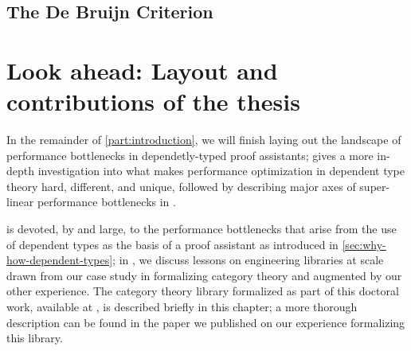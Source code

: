 \subsection{The De Bruijn Criterion}\label{sec:debruijn-criterion}

\section{Look ahead: Layout and contributions of the thesis}\label{sec:intro:layout}
In the remainder of \autoref{part:introduction}, we will finish laying out the landscape of performance bottlenecks in dependetly-typed proof assistants;
 gives a more in-depth investigation into what makes performance optimization in dependent type theory hard, different, and unique, followed by describing major axes of super-linear performance bottlenecks in .

 is devoted, by and large, to the performance bottlenecks that arise from the use of dependent types as the basis of a proof assistant as introduced in \autoref{sec:why-how-dependent-types};
in , we discuss lessons on engineering libraries at scale drawn from our case study in formalizing category theory %
and augmented by our other experience.
The category theory library formalized as part of this doctoral work, available at \textcite{HoTT/HoTT-categories}, is described briefly in this chapter; a more thorough description can be found in the paper we published on our experience formalizing this library.~\cite{category-coq-experience}

